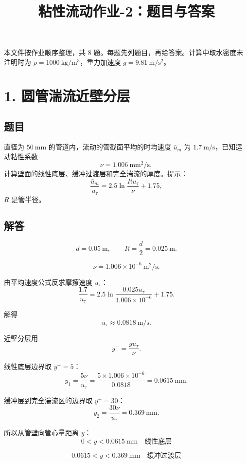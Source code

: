﻿\documentclass[11pt,a4paper]{ctexart}
\title{\vspace{-1.3em}粘性流动作业-2：题目与答案}
\author{}
\date{}
\begin{document}
\maketitle
\vspace{-2.2em}

\begin{tcolorbox}[colback=blue!3,colframe=blue!50!black,title=说明]
本文件按作业顺序整理，共 8 题。每题先列题目，再给答案。计算中取水密度未注明时为
\(\rho=1000\ \mathrm{kg/m^3}\)，重力加速度 \(g=9.81\ \mathrm{m/s^2}\)。
\end{tcolorbox}

\section*{1. 圆管湍流近壁分层}

\subsection*{题目}

直径为 \(50\ \mathrm{mm}\) 的管道内，流动的管截面平均的时均速度
\(\bar u_m\) 为 \(1.7\ \mathrm{m/s}\)，已知运动粘性系数
\[
\nu=1.006\ \mathrm{mm^2/s},
\]
计算壁面的线性底层、缓冲过渡层和完全湍流的厚度。提示：
\[
\frac{\bar u_m}{u_\tau}=2.5\ln\frac{Ru_\tau}{\nu}+1.75,
\]
\(R\) 是管半径。

\subsection*{解答}

\[
d=0.05\ \mathrm{m},\qquad R=\frac d2=0.025\ \mathrm{m}.
\]

\[
\nu=1.006\times10^{-6}\ \mathrm{m^2/s}.
\]

由平均速度公式反求摩擦速度 \(u_\tau\)：
\[
\frac{1.7}{u_\tau}
=2.5\ln\frac{0.025u_\tau}{1.006\times10^{-6}}+1.75.
\]

解得
\[
u_\tau\approx0.0818\ \mathrm{m/s}.
\]

近壁分层用
\[
y^+=\frac{yu_\tau}{\nu}.
\]

线性底层边界取 \(y^+=5\)：
\[
y_1=\frac{5\nu}{u_\tau}
=\frac{5\times1.006\times10^{-6}}{0.0818}
=0.0615\ \mathrm{mm}.
\]

缓冲层到完全湍流区的边界取 \(y^+=30\)：
\[
y_2=\frac{30\nu}{u_\tau}
=0.369\ \mathrm{mm}.
\]

所以从管壁向管心量距离 \(y\)：
\[
\boxed{0<y<0.0615\ \mathrm{mm}\quad\text{线性底层}}
\]

\[
\boxed{0.0615<y<0.369\ \mathrm{mm}\quad\text{缓冲过渡层}}
\]
\end{document}
